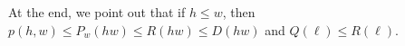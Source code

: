 \documentclass[12pt,a4paper]{amsart}
\numberwithin{equation}{section}
\theoremstyle{plain}
\newtheorem{prob}[thm]{Problem}
\theoremstyle{definition}
\theoremstyle{remark}
\begin{document}
At the end, we point out that if $h\le  w$, then
$
p(h,w)\le  P_w(hw)\le  R(hw)\le  D(hw)
$
and
$
Q(\ell)\le  R(\ell).
$

\end{document}
